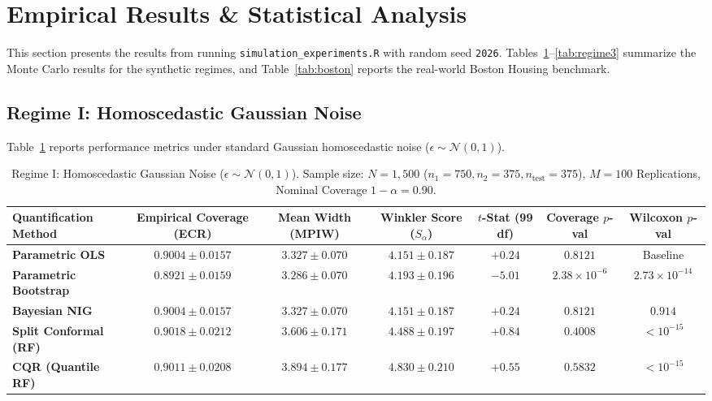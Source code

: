 \documentclass[journal]{IEEEtran}
\begin{document}
\section{Empirical Results \& Statistical Analysis}\label{sec:results}
This section presents the results from running \texttt{simulation\_experiments.R} with random seed \texttt{2026}. Tables~\ref{tab:regime1}--\ref{tab:regime3} summarize the Monte Carlo results for the synthetic regimes, and Table~\ref{tab:boston} reports the real-world Boston Housing benchmark.

\subsection{Regime I: Homoscedastic Gaussian Noise}
Table~\ref{tab:regime1} reports performance metrics under standard Gaussian homoscedastic noise ($\epsilon \sim \mathcal{N}(0, 1)$).

\begin{table}[!t]
\centering
\caption{Regime I: Homoscedastic Gaussian Noise ($\epsilon \sim \mathcal{N}(0, 1)$). Sample size: $N = 1,500$ ($n_1 = 750, n_2 = 375, n_{\text{test}} = 375$), $M = 100$ Replications, Nominal Coverage $1 - \alpha = 0.90$.}
\label{tab:regime1}
\begin{tabular}{lcccccc}
\toprule
\textbf{Quantification Method} & \textbf{Empirical Coverage (ECR)} & \textbf{Mean Width (MPIW)} & \textbf{Winkler Score ($S_\alpha$)} & \textbf{$t$-Stat (99 df)} & \textbf{Coverage $p$-val} & \textbf{Wilcoxon $p$-val} \\
\midrule
\textbf{Parametric OLS} & $0.9004 \pm 0.0157$ & $\mathbf{3.327} \pm \mathbf{0.070}$ & $\mathbf{4.151} \pm \mathbf{0.187}$ & $+0.24$ & $0.8121$ & Baseline \\
\textbf{Parametric Bootstrap} & $0.8921 \pm 0.0159$ & $\mathbf{3.286} \pm \mathbf{0.070}$ & $4.193 \pm 0.196$ & $-5.01$ & $2.38 \times 10^{-6}$ & $2.73 \times 10^{-14}$ \\
\textbf{Bayesian NIG} & $0.9004 \pm 0.0157$ & $\mathbf{3.327} \pm \mathbf{0.070}$ & $\mathbf{4.151} \pm \mathbf{0.187}$ & $+0.24$ & $0.8121$ & $0.914$ \\
\textbf{Split Conformal (RF)} & $\mathbf{0.9018} \pm \mathbf{0.0212}$ & $3.606 \pm 0.171$ & $4.488 \pm 0.197$ & $+0.84$ & $0.4008$ & $< 10^{-15}$ \\
\textbf{CQR (Quantile RF)} & $0.9011 \pm 0.0208$ & $3.894 \pm 0.177$ & $4.830 \pm 0.210$ & $+0.55$ & $0.5832$ & $< 10^{-15}$ \\
\bottomrule
\end{tabular}
\end{table}
\end{document}

